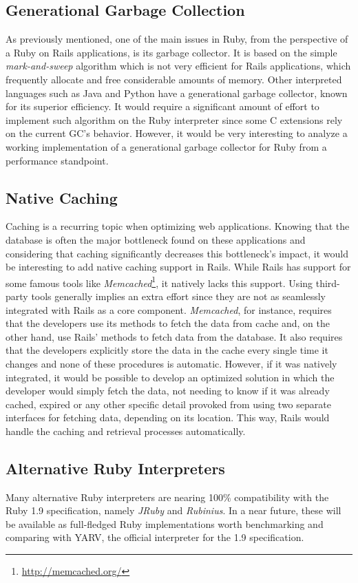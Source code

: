 \subsection{Generational Garbage Collection}
As previously mentioned, one of the main issues in Ruby, from the perspective of a Ruby on Rails applications, is its garbage collector. It is based on the simple \textit{mark-and-sweep} algorithm which is not very efficient for Rails applications, which frequently allocate and free considerable amounts of memory. Other interpreted languages such as Java and Python have a generational garbage collector, known for its superior efficiency. It would require a significant amount of effort to implement such algorithm on the Ruby interpreter since some C extensions rely on the current GC's behavior. However, it would be very interesting to analyze a working implementation of a generational garbage collector for Ruby from a performance standpoint.

\subsection{Native Caching}
Caching is a recurring topic when optimizing web applications. Knowing that the database is often the major bottleneck found on these applications and considering that caching significantly decreases this bottleneck's impact, it would be interesting to add native caching support in Rails. While Rails has support for some famous tools like \textit{Memcached}\footnote{\url{http://memcached.org/}}, it natively lacks this support. Using third-party tools generally implies an extra effort since they are not as seamlessly integrated with Rails as a core component. \textit{Memcached}, for instance, requires that the developers use its methods to fetch the data from cache and, on the other hand, use Rails' methods to fetch data from the database. It also requires that the developers explicitly store the data in the cache every single time it changes and none of these procedures is automatic. However, if it was natively integrated, it would be possible to develop an optimized solution in which the developer would simply fetch the data, not needing to know if it was already cached, expired or any other specific detail provoked from using two separate interfaces for fetching data, depending on its location. This way, Rails would handle the caching and retrieval processes automatically.

\subsection{Alternative Ruby Interpreters}
Many alternative Ruby interpreters are nearing 100\% compatibility with the Ruby 1.9 specification, namely \textit{JRuby} and \textit{Rubinius}. In a near future, these will be available as full-fledged Ruby implementations worth benchmarking and comparing with YARV, the official interpreter for the 1.9 specification.

